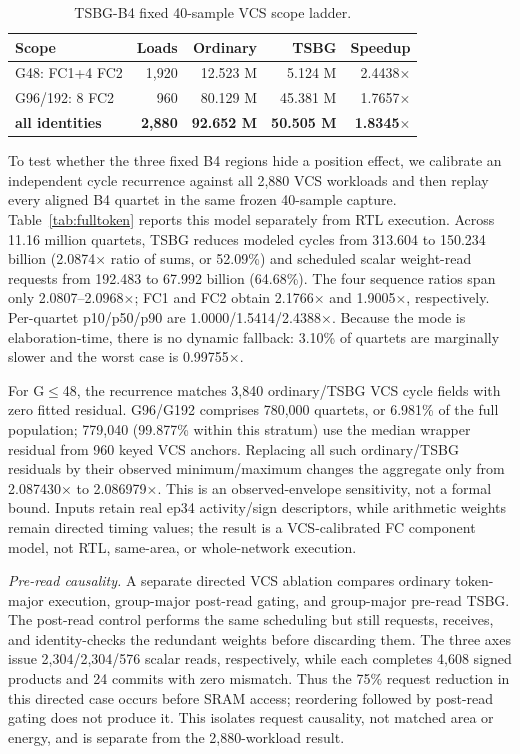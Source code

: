 \documentclass[journal]{IEEEtran}
\begin{document}
\begin{table}[t]
\caption{TSBG-B4 fixed 40-sample VCS scope ladder.}
\label{tab:tsbgseq}
\centering
\scriptsize
\begin{tabular}{@{}lrrrr@{}}
\toprule
Scope & Loads & Ordinary & TSBG & Speedup \\
\midrule
G48: FC1+4 FC2 & 1,920 & 12.523 M & 5.124 M & 2.4438$\times$ \\
G96/192: 8 FC2 & 960 & 80.129 M & 45.381 M & 1.7657$\times$ \\
\textbf{all identities} & \textbf{2,880} & \textbf{92.652 M} & \textbf{50.505 M} & \textbf{1.8345$\times$} \\
\bottomrule
\end{tabular}
\end{table}

To test whether the three fixed B4 regions hide a position effect, we
calibrate an independent cycle recurrence against all 2,880 VCS workloads and
then replay every aligned B4 quartet in the same frozen 40-sample capture.
Table~\ref{tab:fulltoken} reports this model separately from RTL execution.
Across 11.16 million quartets, TSBG reduces modeled cycles from 313.604 to
150.234 billion (2.0874$\times$ ratio of sums, or 52.09\%) and scheduled scalar weight-read
requests from 192.483 to 67.992 billion (64.68\%).  The four sequence ratios
span only 2.0807--2.0968$\times$; FC1 and FC2 obtain 2.1766$\times$ and
1.9005$\times$, respectively.  Per-quartet p10/p50/p90 are
1.0000/1.5414/2.4388$\times$.  Because the mode is elaboration-time, there is
no dynamic fallback: 3.10\% of quartets are marginally slower and the worst
case is 0.99755$\times$.

For G$\leq$48, the recurrence matches 3,840 ordinary/TSBG VCS cycle fields
with zero fitted residual.  G96/G192 comprises 780,000 quartets, or 6.981\%
of the full population; 779,040 (99.877\% within this stratum) use the median
wrapper residual from 960 keyed VCS anchors.
Replacing all such ordinary/TSBG residuals by their observed minimum/maximum
changes the aggregate only from 2.087430$\times$ to 2.086979$\times$.  This is
an observed-envelope sensitivity, not a formal bound.  Inputs retain real
ep34 activity/sign descriptors, while arithmetic weights remain directed
timing values; the result is a VCS-calibrated FC component model, not RTL,
same-area, or whole-network execution.

\emph{Pre-read causality.} A separate directed VCS ablation compares ordinary
token-major execution, group-major post-read gating, and group-major pre-read
TSBG.  The post-read control performs the same scheduling but still requests,
receives, and identity-checks the redundant weights before discarding them.
The three axes issue 2,304/2,304/576 scalar reads, respectively, while each
completes 4,608 signed products and 24 commits with zero mismatch.  Thus the
75\% request reduction in this directed case occurs before SRAM access;
reordering followed by post-read gating does not produce it.  This isolates
request causality, not matched area or energy, and is separate from the
2,880-workload result.
\end{document}
